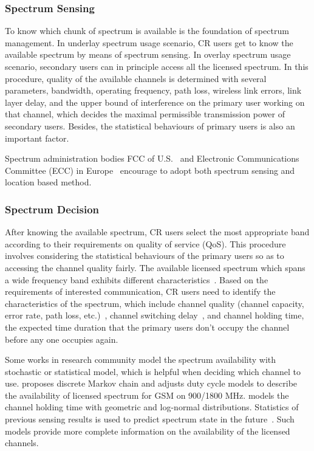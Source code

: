 \subsubsection*{Spectrum Sensing}
To know which chunk of spectrum is available is the foundation of spectrum management.
In underlay spectrum usage scenario, CR users get to know the available spectrum by means of spectrum sensing.
In overlay spectrum usage scenario, secondary users can in principle access all the licensed spectrum.
In this procedure, quality of the available channels is determined with several parameters, \ie bandwidth, operating frequency, path loss, wireless link errors, link layer delay, and the upper bound of interference on the primary user working on that channel, which decides the maximal permissible transmission power of secondary users.
Besides, the statistical behaviours of primary users is also an important factor.

Spectrum administration bodies FCC of U.S.~\cite{FCC_2010_sedond_memorandumm} and Electronic Communications Committee (\gls{ECC}) in Europe~\cite{ecc159} encourage to adopt both spectrum sensing and location based method.

\subsubsection{Spectrum Decision}
After knowing the available spectrum, CR users select the most appropriate band according to their requirements on quality of service (QoS).
This procedure involves considering the statistical behaviours of the primary users so as to accessing the channel quality fairly.
The available licensed spectrum which spans a wide frequency band exhibits different characteristics~\cite{spectrum_decision_TMC11}.
Based on the requirements of interested communication, CR users need to identify the characteristics of the spectrum, which include channel quality (channel capacity, error rate, path loss, etc.)~\cite{spectrum_decision_TMC11}, channel switching delay~\cite{channel_switch_delay11}, and channel holding time, \ie the expected time duration that the primary users don't occupy the channel before any one occupies again.

Some works in research community model the spectrum availability with stochastic or statistical model, which is helpful when deciding which channel to use.
\cite{Discrete-Time_Spectrum_Occupancy_Model_DySPAN_2011} proposes discrete Markov chain and adjusts duty cycle models to describe the availability of licensed spectrum for GSM on 900/1800 MHz.
\cite{Wellens200910} models the channel holding time with geometric and log-normal distributions.
Statistics of previous sensing results is used to predict spectrum state in the future~\cite{spectrum-discovery-tmc08}.
Such models provide more complete information on the availability of the licensed channels.




